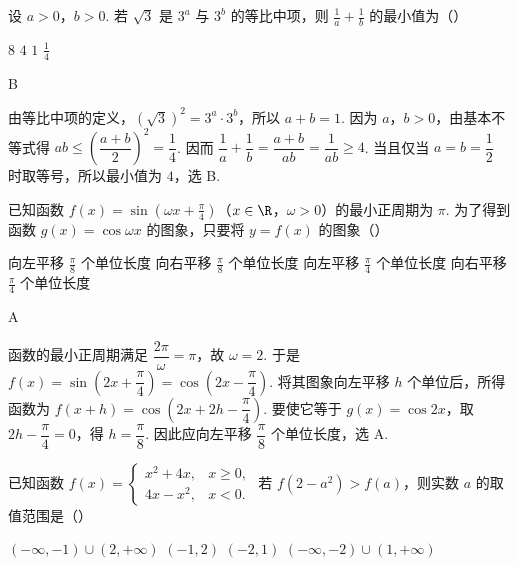\begin{problem}
设 \(a > 0\)，\(b > 0\). 若 \(\sqrt{3}\) 是 \(3^{a}\) 与 \(3^{b}\) 的等比中项，则 \(\frac{1}{a} + \frac{1}{b}\) 的最小值为（\quad）

\choices
    {\(8\)}
    {\(4\)}
    {\(1\)}
    {\(\frac{1}{4}\)}
\end{problem}

\begin{answer}
B
\end{answer}

\begin{solution}
由等比中项的定义，\((\sqrt{3})^2=3^a\cdot3^b\)，所以 \(a+b=1\). 因为 \(a\)，\(b>0\)，由基本不等式得 \(ab\leqslant\left(\dfrac{a+b}{2}\right)^2=\dfrac14\). 因而
\(\dfrac1a+\dfrac1b=\dfrac{a+b}{ab}=\dfrac1{ab}\geqslant4\).
当且仅当 \(a=b=\dfrac12\) 时取等号，所以最小值为 \(4\)，选 B.
\end{solution}

\begin{problem}
已知函数 \( f(x) = \sin \left( \omega x + \frac{\pi}{4} \right) \)（\(x \in \R\)，\(\omega > 0\)）的最小正周期为 \( \pi \). 为了得到函数 \( g(x) = \cos \omega x \) 的图象，只要将 \( y = f(x) \) 的图象（\quad）

\choices
    {向左平移 \(\frac{\pi}{8}\) 个单位长度}
    {向右平移 \(\frac{\pi}{8}\) 个单位长度}
    {向左平移 \(\frac{\pi}{4}\) 个单位长度}
    {向右平移 \(\frac{\pi}{4}\) 个单位长度}
\end{problem}

\begin{answer}
A
\end{answer}

\begin{solution}
函数的最小正周期满足 \(\dfrac{2\pi}{\omega}=\pi\)，故 \(\omega=2\). 于是
\(f(x)=\sin\left(2x+\dfrac\pi4\right)=\cos\left(2x-\dfrac\pi4\right)\).
将其图象向左平移 \(h\) 个单位后，所得函数为 \(f(x+h)=\cos\left(2x+2h-\dfrac\pi4\right)\). 要使它等于 \(g(x)=\cos2x\)，取 \(2h-\dfrac\pi4=0\)，得 \(h=\dfrac\pi8\). 因此应向左平移 \(\dfrac\pi8\) 个单位长度，选 A.
\end{solution}

\begin{problem}
已知函数 \( f(x) = \begin{cases}
x^2 + 4x, & x \geqslant 0,\\
4x - x^2, & x < 0.
\end{cases} \) 若 \( f(2 - a^2) > f(a) \)，则实数 \( a \) 的取值范围是（\quad）

\choices
    {\((- \infty, -1) \cup (2, +\infty)\)}
    {\((-1, 2)\)}
    {\((-2, 1)\)}
    {\((-\infty, -2) \cup (1, +\infty)\)}
\end{problem}

